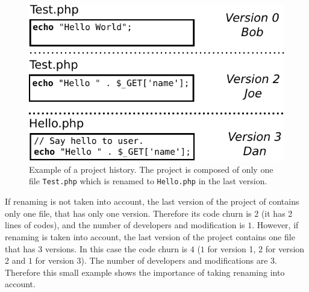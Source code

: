 \begin{figure}[t]
	\centering
	\includegraphics[width=1\linewidth,keepaspectratio]{data/figures/history.pdf}
	\caption{Example of a project history. The project is composed of only one file \texttt{Test.php} which is renamed to \texttt{Hello.php} in the last version.}
	\label{fig:history}
\end{figure}

If renaming is not taken into account, the last version of the project of  contains only one file, that has only one version. Therefore its code churn is $2$ (it has 2 lines of codes), and the number of developers and modification is $1$. However, if renaming is taken into account, the last version of the project contains one file that has $3$ versions. In this case the code churn is $4$ ($1$ for version 1, $2$ for version 2 and $1$ for version $3$). The number of developers and modifications are $3$. Therefore this small example shows the importance of taking renaming into account.
